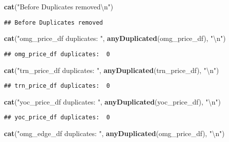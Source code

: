 \documentclass[]{article}
\newenvironment{Shaded}{\begin{snugshade}}{\end{snugshade}}
\newcommand{\KeywordTok}[1]{\textcolor[rgb]{0.13,0.29,0.53}{\textbf{#1}}}
\newcommand{\CharTok}[1]{\textcolor[rgb]{0.31,0.60,0.02}{#1}}
\newcommand{\StringTok}[1]{\textcolor[rgb]{0.31,0.60,0.02}{#1}}
\newcommand{\NormalTok}[1]{#1}
\begin{document}
\begin{Shaded}
\begin{Highlighting}[]
\KeywordTok{cat}\NormalTok{(}\StringTok{"Before Duplicates removed}\CharTok{\textbackslash{}n}\StringTok{"}\NormalTok{)}
\end{Highlighting}
\end{Shaded}

\begin{verbatim}
## Before Duplicates removed
\end{verbatim}

\begin{Shaded}
\begin{Highlighting}[]
\KeywordTok{cat}\NormalTok{(}\StringTok{"omg_price_df duplicates: "}\NormalTok{, }\KeywordTok{anyDuplicated}\NormalTok{(omg_price_df), }\StringTok{"}\CharTok{\textbackslash{}n}\StringTok{"}\NormalTok{)}
\end{Highlighting}
\end{Shaded}

\begin{verbatim}
## omg_price_df duplicates:  0
\end{verbatim}

\begin{Shaded}
\begin{Highlighting}[]
\KeywordTok{cat}\NormalTok{(}\StringTok{"trn_price_df duplicates: "}\NormalTok{, }\KeywordTok{anyDuplicated}\NormalTok{(trn_price_df), }\StringTok{"}\CharTok{\textbackslash{}n}\StringTok{"}\NormalTok{)}
\end{Highlighting}
\end{Shaded}

\begin{verbatim}
## trn_price_df duplicates:  0
\end{verbatim}

\begin{Shaded}
\begin{Highlighting}[]
\KeywordTok{cat}\NormalTok{(}\StringTok{"yoc_price_df duplicates: "}\NormalTok{, }\KeywordTok{anyDuplicated}\NormalTok{(yoc_price_df), }\StringTok{"}\CharTok{\textbackslash{}n}\StringTok{"}\NormalTok{)}
\end{Highlighting}
\end{Shaded}

\begin{verbatim}
## yoc_price_df duplicates:  0
\end{verbatim}

\begin{Shaded}
\begin{Highlighting}[]
\KeywordTok{cat}\NormalTok{(}\StringTok{"omg_edge_df  duplicates: "}\NormalTok{, }\KeywordTok{anyDuplicated}\NormalTok{(omg_price_df), }\StringTok{"}\CharTok{\textbackslash{}n}\StringTok{"}\NormalTok{)}
\end{Highlighting}
\end{Shaded}
\end{document}
